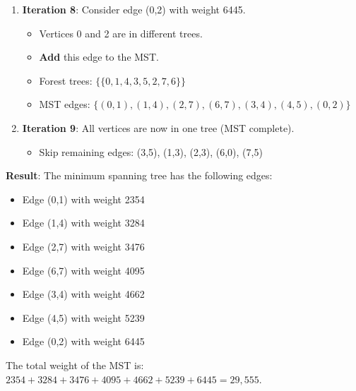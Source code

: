 \documentclass{article}
\theoremstyle{definition}
\begin{document}
\begin{enumerate}
\item \textbf{Iteration 8}: Consider edge (0,2) with weight 6445.
   \begin{itemize}
   \item Vertices 0 and 2 are in different trees.
   \item \textbf{Add} this edge to the MST.
   \item Forest trees: $\{\{0,1,4,3,5,2,7,6\}\}$
   \item MST edges: $\{(0,1), (1,4), (2,7), (6,7), (3,4), (4,5), (0,2)\}$
   \end{itemize}

\item \textbf{Iteration 9}: All vertices are now in one tree (MST complete).
   \begin{itemize}
   \item Skip remaining edges: (3,5), (1,3), (2,3), (6,0), (7,5)
   \end{itemize}
\end{enumerate}

\noindent\textbf{Result}: The minimum spanning tree has the following edges:
\begin{itemize}
\item Edge (0,1) with weight 2354
\item Edge (1,4) with weight 3284
\item Edge (2,7) with weight 3476
\item Edge (6,7) with weight 4095
\item Edge (3,4) with weight 4662
\item Edge (4,5) with weight 5239
\item Edge (0,2) with weight 6445
\end{itemize}

\noindent The total weight of the MST is: $2354 + 3284 + 3476 + 4095 + 4662 + 5239 + 6445 = 29,555$.
\end{document}
